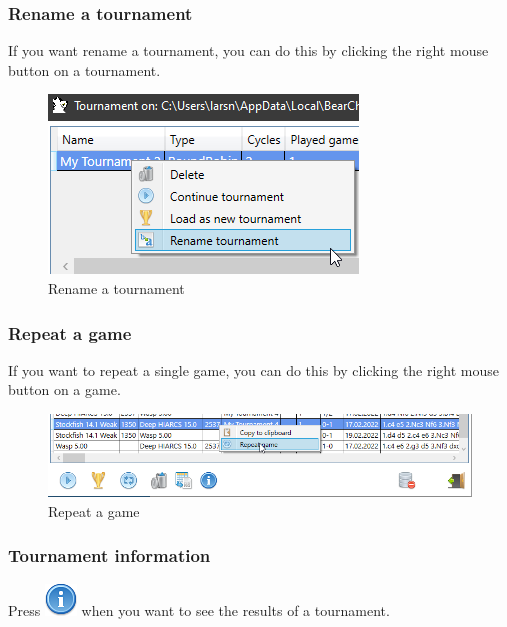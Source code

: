 \documentclass[11pt,a4paper]{article}
\begin{document}
\subsubsection{Rename a tournament}
If you want rename a tournament, you can do this by clicking the right mouse button on a tournament.

\begin{figure}[H]
	\centering
	\includegraphics[scale=1.0]{EngineTournament9.png}
	\caption{Rename a tournament}
	\label{fig:EngineTournament9}
\end{figure}


\subsubsection{Repeat a game}
If you want to repeat a single game, you can do this by clicking the right mouse button on a game.

\begin{figure}[H]
	\centering
	\includegraphics[scale=0.6]{EngineTournament8.png}
	\caption{Repeat a game}
	\label{fig:EngineTournament8}
\end{figure}


\subsubsection{Tournament information}
Press \includegraphics[scale=0.5]{information.png} when you want to see the results of a tournament.
\end{document}
